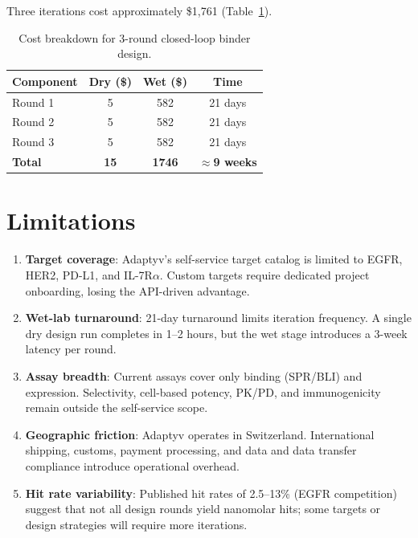 \documentclass[12pt,a4paper]{article}
\begin{document}
Three iterations cost approximately \$1,761 (Table~\ref{tab:cost}).

\begin{table}[htbp]
  \centering
  \begin{tabular}{lccc}
    \toprule
    Component & {Dry (\$)} & {Wet (\$)} & {Time} \\
    \midrule
    Round 1 & 5  & 582 & 21 days \\
    Round 2 & 5  & 582 & 21 days \\
    Round 3 & 5  & 582 & 21 days \\
    \midrule
    \textbf{Total} & \textbf{15} & \textbf{1746} & \textbf{$\approx$9 weeks} \\
    \bottomrule
  \end{tabular}
  \caption{Cost breakdown for 3-round closed-loop binder design.}
  \label{tab:cost}
\end{table}

\section{Limitations}\label{sec:limitations}

\begin{enumerate}
  \item \textbf{Target coverage}: Adaptyv's self-service target catalog is
    limited to EGFR, HER2, PD-L1, and IL-7R$\alpha$. Custom targets require
    dedicated project onboarding, losing the API-driven advantage.
  \item \textbf{Wet-lab turnaround}: 21-day turnaround limits iteration
    frequency. A single dry design run completes in 1--2 hours, but the wet
    stage introduces a 3-week latency per round.
  \item \textbf{Assay breadth}: Current assays cover only binding (SPR/BLI)
    and expression. Selectivity, cell-based potency, PK/PD, and
    immunogenicity remain outside the self-service scope.
  \item \textbf{Geographic friction}: Adaptyv operates in Switzerland.
    International shipping, customs, payment processing, and data
    and data transfer compliance introduce operational overhead.
  \item \textbf{Hit rate variability}: Published hit rates of 2.5--13\%
    (EGFR competition) suggest that not all design rounds yield nanomolar
    hits; some targets or design strategies will require more iterations.
\end{enumerate}
\end{document}

